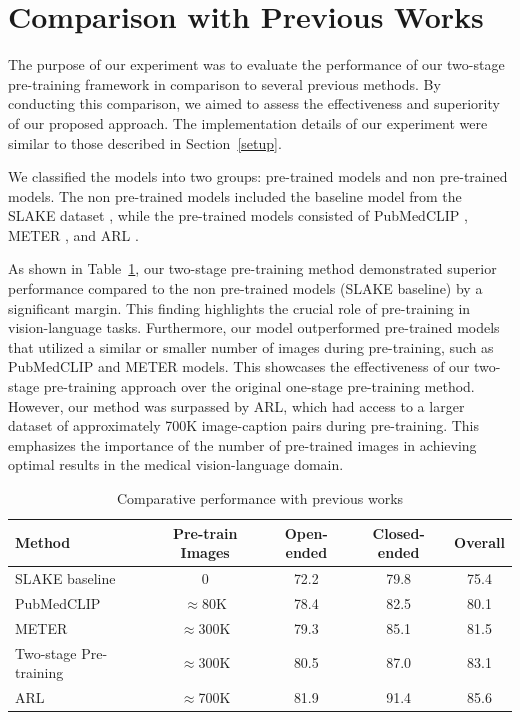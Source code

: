 \section{Comparison with Previous Works}\label{expComparison}
The purpose of our experiment was to evaluate the performance of our two-stage pre-training framework in comparison to several previous methods. By conducting this comparison, we aimed to assess the effectiveness and superiority of our proposed approach. The implementation details of our experiment were similar to those described in Section~\ref{setup}.

We classified the models into two groups: pre-trained models and non pre-trained models. The non pre-trained models included the baseline model from the SLAKE dataset \cite{liu2021slake}, while the pre-trained models consisted of PubMedCLIP \cite{eslami-etal-2023-pubmedclip} , METER \cite{Dou_2022_CVPR}, and ARL \cite{chen2022align}. 

As shown in Table~\ref{tab:compareWithPrevious}, our two-stage pre-training method demonstrated superior performance compared to the non pre-trained models (SLAKE baseline) by a significant margin. This finding highlights the crucial role of pre-training in vision-language tasks. Furthermore, our model outperformed pre-trained models that utilized a similar or smaller number of images during pre-training, such as PubMedCLIP and METER models. This showcases the effectiveness of our two-stage pre-training approach over the original one-stage pre-training method. However, our method was surpassed by ARL, which had access to a larger dataset of approximately 700K image-caption pairs during pre-training. This emphasizes the importance of the number of pre-trained images in achieving optimal results in the medical vision-language domain.

\begin{table}[h]
    \centering
    \caption{Comparative performance with previous works}
    \setlength{\tabcolsep}{3.pt}
    \begin{tabular}{l c c c c}
        \toprule
        Method & Pre-train Images & Open-ended & Closed-ended & Overall  \\
        \midrule
        SLAKE baseline \cite{liu2021slake}& 0 & 72.2 & 79.8 & 75.4 \\
        PubMedCLIP \cite{eslami-etal-2023-pubmedclip} & $\approx$80K & 78.4 & 82.5 & 80.1 \\
        METER \cite{Dou_2022_CVPR} & $\approx$300K & 79.3 & 85.1 & 81.5 \\
        Two-stage Pre-training & $\approx$300K & 80.5 & 87.0 & 83.1 \\
        \rowcolor{LightCyan}
        ARL \cite{chen2022align} & $\approx$700K & 81.9 & 91.4 & 85.6 \\
        \bottomrule
    \end{tabular}
    \label{tab:compareWithPrevious}
\end{table}

